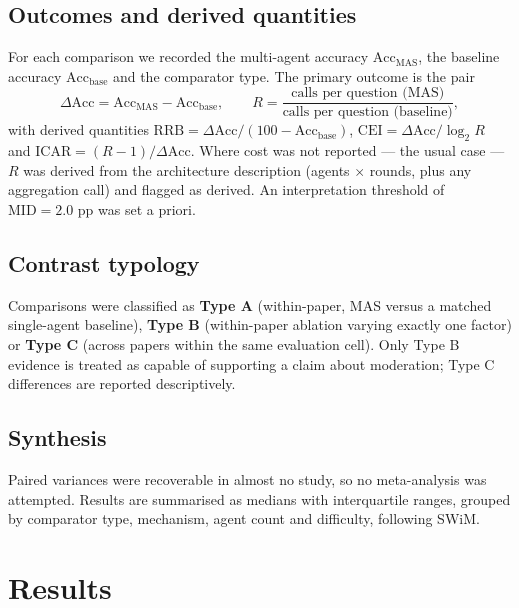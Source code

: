 \documentclass[11pt,a4paper]{article}
\begin{document}
\subsection{Outcomes and derived quantities}
For each comparison we recorded the multi-agent accuracy $\mathrm{Acc}_{\text{MAS}}$, the
baseline accuracy $\mathrm{Acc}_{\text{base}}$ and the comparator type. The primary outcome
is the pair
\[
\Delta\mathrm{Acc}=\mathrm{Acc}_{\text{MAS}}-\mathrm{Acc}_{\text{base}},
\qquad
R=\frac{\text{calls per question (MAS)}}{\text{calls per question (baseline)}},
\]
with derived quantities
$\mathrm{RRB}=\Delta\mathrm{Acc}/(100-\mathrm{Acc}_{\text{base}})$,
$\mathrm{CEI}=\Delta\mathrm{Acc}/\log_2 R$ and
$\mathrm{ICAR}=(R-1)/\Delta\mathrm{Acc}$.
Where cost was not reported --- the usual case --- $R$ was derived from the architecture
description (agents $\times$ rounds, plus any aggregation call) and flagged as derived.
An interpretation threshold of $\mathrm{MID}=2.0$ pp was set a priori.

\subsection{Contrast typology}
Comparisons were classified as
\textbf{Type A} (within-paper, MAS versus a matched single-agent baseline),
\textbf{Type B} (within-paper ablation varying exactly one factor) or
\textbf{Type C} (across papers within the same evaluation cell).
Only Type B evidence is treated as capable of supporting a claim about moderation;
Type C differences are reported descriptively.

\subsection{Synthesis}
Paired variances were recoverable in almost no study, so no meta-analysis was attempted.
Results are summarised as medians with interquartile ranges, grouped by comparator type,
mechanism, agent count and difficulty, following SWiM.

\section{Results}
\end{document}
